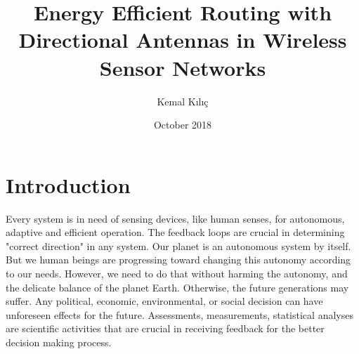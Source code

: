 \documentclass[12pt, oneandhalf, chaparabic, sees, ms]{metu}
\author{Kemal Kılıç}
\title{Energy Efficient Routing with Directional Antennas in Wireless Sensor Networks}
\date{October 2018}
\begin{document}

\begin{preliminaries}


\end{preliminaries}
%   
% 
%
% 
% 





% 
% 
% 
% 
% 
% 
% 






\chapter{Introduction}\label{chp:Intro}

Every system is in need of sensing devices, like human senses, for autonomous, adaptive and efficient operation.
The feedback loops are crucial in determining "correct direction" in any system. Our planet is an autonomous system by itself.
But we human beings are progressing toward changing this autonomy according to our needs. However, we need to do that without harming the autonomy, 
and the delicate balance of the planet Earth. Otherwise, the future generations may suffer. Any political, economic, environmental, or social decision can have
unforeseen effects for the future. Assessments, measurements, statistical analyses are scientific activities that are crucial in receiving feedback
for the better decision making process.
\end{document}
